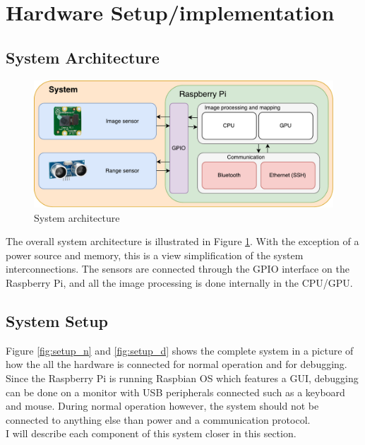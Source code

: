 \section{Hardware Setup/implementation}
\subsection{System Architecture}

\begin{figure}[h]
  \centering
  \includegraphics[width=1\textwidth]{fig/system}
  \caption{System architecture}
  \label{fig:system}
\end{figure}

The overall system architecture is illustrated in Figure \ref{fig:system}. With the exception of a power source and memory, this is a view simplification of the system interconnections. The sensors are connected through the GPIO interface on the Raspberry Pi, and all the image processing is done internally in the CPU/GPU.

\subsection{System Setup}
Figure \ref{fig:setup_n} and \ref{fig:setup_d} shows the complete system in a picture of how the all the hardware is connected for normal operation and for debugging. Since the Raspberry Pi is running Raspbian OS which features a GUI, debugging can be done on a monitor with USB peripherals connected such as a keyboard and mouse. During normal operation however, the system should not be connected to anything else than power and a communication protocol. \\

I will describe each component of this system closer in this section.

